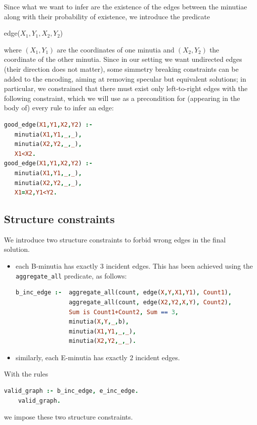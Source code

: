 \documentclass[8pt]{article}
\begin{document}
Since what we want to infer are the existence of the edges between the minutiae
along with their probability of existence, we introduce the predicate
  \begin{center}
    \textsf{edge($X_1,Y_1,X_2,Y_2$)}
  \end{center}
where $(X_1,Y_1)$ are the coordinates of one minutia and $(X_2,Y_2)$ the
coordinate of the other minutia.
Since in our setting we want undirected edges (their direction does not
matter), some simmetry breaking constraints can be added to the encoding,
aiming at removing specular but equivalent solutions; in particular, we
constrained that there must exist only left-to-right edges with the following
constraint, which we will use as a precondition for (\ie appearing in the body
of) every rule to infer an edge:
  \begin{center}
  \begin{lstlisting}[language=Prolog,frame = single,basicstyle=\footnotesize\ttfamily]
good_edge(X1,Y1,X2,Y2) :-
   minutia(X1,Y1,_,_),
   minutia(X2,Y2,_,_),
   X1<X2.
good_edge(X1,Y1,X2,Y2) :-
   minutia(X1,Y1,_,_),
   minutia(X2,Y2,_,_),
   X1=X2,Y1<Y2. 
  \end{lstlisting}
  \end{center}





\subsection{Structure constraints}\label{sub:structure_cons}
We introduce two structure constraints to forbid wrong edges
in the final solution.
\begin{itemize}
  \item
    each B-minutia has exactly $3$ incident edges. This has been achieved
    using the \texttt{aggregate\_all} predicate, as follows:
      \begin{lstlisting}[language=Prolog,frame = single,basicstyle=\footnotesize\ttfamily]
b_inc_edge :-  aggregate_all(count, edge(X,Y,X1,Y1), Count1),
               aggregate_all(count, edge(X2,Y2,X,Y), Count2),
               Sum is Count1+Count2, Sum == 3,
               minutia(X,Y,_,b),
               minutia(X1,Y1,_,_),
               minutia(X2,Y2,_,_).
      \end{lstlisting}
  \item
    similarly, each E-minutia has exactly $2$ incident edges.
\end{itemize}
With the rules 
  \begin{lstlisting}[language=Prolog,frame = single,basicstyle=\footnotesize\ttfamily]
    valid_graph :- b_inc_edge, e_inc_edge.
    valid_graph.
  \end{lstlisting}
we impose these two structure constraints.
\end{document}
